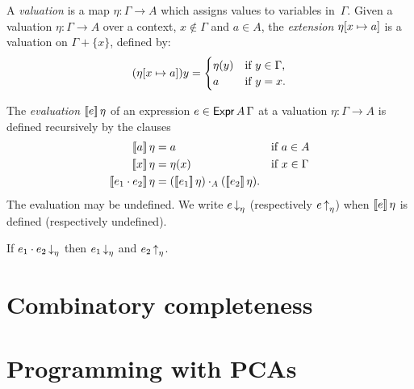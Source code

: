\begin{definition}
  \label{def:Valuation}
  A \emph{valuation} is a map $\eta : \Gamma \to A$ which assigns values to variables in~$\Gamma$.
  Given a valuation $\eta : \Gamma \to A$ over a context, $x \not\in \Gamma$ and $a \in A$, the
  \emph{extension} $\eta[x \mapsto a]$ is a valuation on $\Gamma + \{x\}$, defined by:
  \begin{equation*}
    (\eta[x \mapsto a]) y =
    \begin{cases}
      \eta(y) &\text{if $y \in \Gamma$,}\\
      a       &\text{if $y = x$.}
    \end{cases}
  \end{equation*}
\end{definition}

\begin{definition}
  \label{def:Expr.eval}
  \leanok
  The \emph{evaluation} $[\![ e ]\!] \, \eta$ of an expression $e \in \mathsf{Expr}\,A\,\Gamma$ at a
  valuation $\eta : \Gamma \to A$ is defined recursively by the clauses
  \begin{align*}
    \eval{a}{\eta} &= a        &&\text{if $a \in A$}\\
    \eval{x}{\eta} &= \eta(x)  &&\text{if $x \in \Gamma$}\\
    \eval{e_1 \cdot e_2}{\eta} &= (\eval{e_1} \eta) \cdot_A (\eval{e_2} \eta).
  \end{align*}
  The evaluation may be undefined. We write $e\,{\downarrow}_\eta$ (respectively $e\,{\uparrow}_\eta$) when $[\![ e ]\!] \, \eta$ is defined (respectively undefined).
\end{definition}

\begin{proposition}
  \label{prop:Expr.defined}
  \leanok
  If $e_1 \cdot e_2\,{\downarrow}_\eta$ then $e_1\,{\downarrow}_\eta$ and $e_2\,{\uparrow}_\eta$.
\end{proposition}

\chapter{Combinatory completeness}


\chapter{Programming with PCAs}
